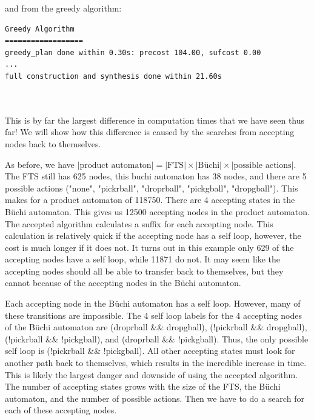 and from the greedy algorithm: \\


\begin{minipage}{\textwidth}
\begingroup
\fontsize{9pt}{12pt}\selectfont
\begin{lstlisting}
Greedy Algorithm
==================
greedy_plan done within 0.30s: precost 104.00, sufcost 0.00
...
full construction and synthesis done within 21.60s
\end{lstlisting} 
\endgroup
\end{minipage} \\ \\


This is by far the largest difference in computation times that we have seen thus far! We will show how this difference is caused by the searches from accepting nodes back to themselves.

As before, we have $|\text{product automaton}| =|\text{FTS}| \times |\text{B\"uchi}| \times |\text{possible actions}|$. The FTS still has 625 nodes, this buchi automaton has 38 nodes, and there are 5 possible actions ("none", "pickrball", "droprball", "pickgball", "dropgball"). This makes for a product automaton of 118750. There are 4 accepting states in the B\"uchi automaton. This gives us 12500 accepting nodes in the product automaton. The accepted algorithm calculates a suffix for each accepting node. This calculation is relatively quick if the accepting node has a self loop, however, the cost is much longer if it does not. It turns out in this example only 629 of the accepting nodes have a self loop, while 11871 do not. It may seem like the accepting nodes should all be able to transfer back to themselves, but they cannot because of the accepting nodes in the B\"uchi automaton. 

Each accepting node in the B\"uchi automaton has a self loop. However, many of these transitions are impossible. The 4 self loop labels for the 4 accepting nodes of the B\"uchi automaton are (droprball \&\& dropgball), (!pickrball \&\& dropgball), (!pickrball \&\& !pickgball), and (droprball \&\& !pickgball). Thus, the only possible self loop is (!pickrball \&\& !pickgball). All other accepting states must look for another path back to themselves, which results in the incredible increase in time. This is likely the largest danger and downside of using the accepted algorithm. The number of accepting states grows with the size of the FTS, the B\"uchi automaton, and the number of possible actions. Then we have to do a search for each of these accepting nodes.  

